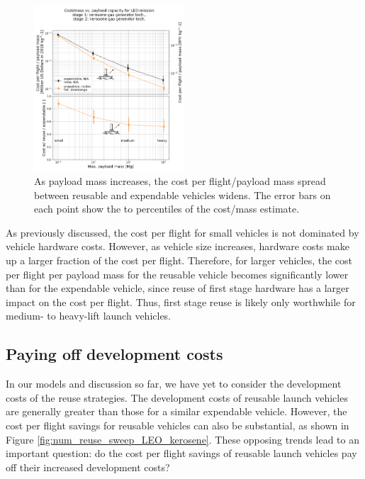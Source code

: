 \documentclass{iaf-iac}
\begin{document}
\begin{multicols}{2}
\begin{figure}[H]
    \centering
    \includegraphics[width=0.5\textwidth]{m_payload_sweep_LEO_kerosene_annotated_pres}
    \caption{\label{fig:m_payload_sweep_LEO_kerosene} As payload mass increases, the cost per flight/payload mass spread between reusable and expendable vehicles widens. The error bars on each point show the  to  percentiles of the cost/mass estimate.}
\end{figure}

As previously discussed, the cost per flight for small vehicles is not dominated by vehicle hardware costs. However, as vehicle size increases, hardware costs make up a larger fraction of the cost per flight. Therefore, for larger vehicles, the cost per flight per payload mass for the reusable vehicle becomes significantly lower than for the expendable vehicle, since reuse of first stage hardware has a larger impact on the cost per flight. Thus, first stage reuse is likely only worthwhile for medium- to heavy-lift launch vehicles.


\subsection{Paying off development costs}

In our models and discussion so far, we have yet to consider the development costs of the reuse strategies. The development costs of reusable launch vehicles are generally greater than those for a similar expendable vehicle. However, the cost per flight savings for reusable vehicles can also be substantial, as shown in Figure \ref{fig:num_reuse_sweep_LEO_kerosene}. These opposing trends lead to an important question: do the cost per flight savings of reusable launch vehicles pay off their increased development costs? 


\end{multicols}
\end{document}

